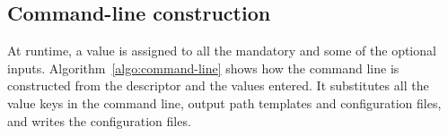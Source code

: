 \documentclass[a4paper,num-refs]{oup-contemporary}
\begin{document}
\subsection{Command-line construction}

At runtime, a value is assigned to all the mandatory and some of the
optional inputs. %
Algorithm~\ref{algo:command-line} shows how the command line is
constructed from the descriptor and the values entered. It
substitutes all the value keys in the command line, output path
templates and configuration files, and writes the configuration files.
\end{document}
